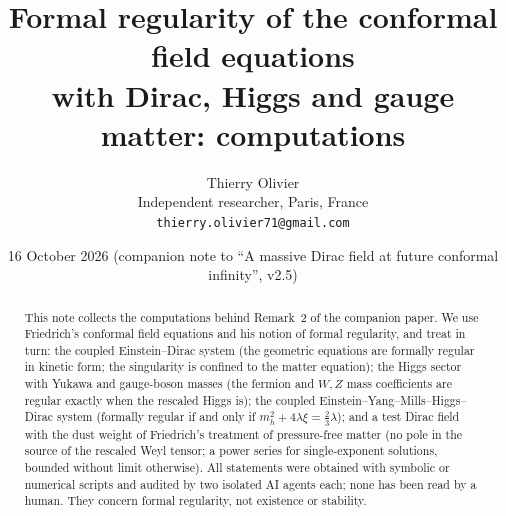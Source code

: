 \documentclass[11pt,a4paper]{article}
\title{\textbf{Formal regularity of the conformal field equations\\ with Dirac, Higgs and gauge matter: computations}}
\author{Thierry Olivier\\ \small Independent researcher, Paris, France\\ \small \texttt{thierry.olivier71@gmail.com}}
\date{16 October 2026 \quad (companion note to ``A massive Dirac field at future conformal infinity'', v2.5)}
\begin{document}
\maketitle

\begin{abstract}
This note collects the computations behind Remark~2 of the companion paper. We use Friedrich's conformal field equations \cite{Friedrich2015} and his notion of formal regularity, and treat in turn: the coupled Einstein--Dirac system (the geometric equations are formally regular in kinetic form; the singularity is confined to the matter equation); the Higgs sector with Yukawa and gauge-boson masses (the fermion and $W,Z$ mass coefficients are regular exactly when the rescaled Higgs is); the coupled Einstein--Yang--Mills--Higgs--Dirac system (formally regular if and only if $m_{h}^{2}+4\lambda\xi=\tfrac23\lambda$); and a test Dirac field with the dust weight of Friedrich's treatment of pressure-free matter \cite{Friedrich2017} (no pole in the source of the rescaled Weyl tensor; a power series for single-exponent solutions, bounded without limit otherwise). All statements were obtained with symbolic or numerical scripts and audited by two isolated AI agents each; none has been read by a human. They concern formal regularity, not existence or stability.
\end{abstract}
\end{document}
